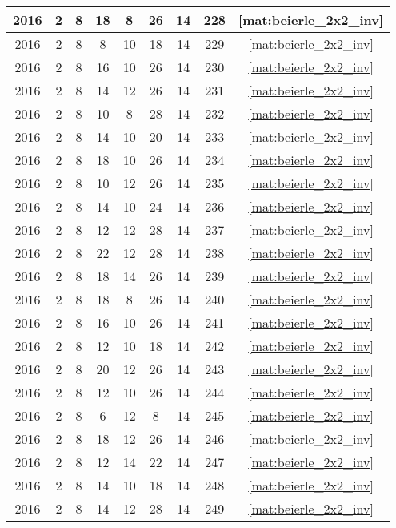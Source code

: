 \begin{longtable}{|c|c|c|c|c|c|c|c|c|}
2016 & 2 & 8 & 18 & 8 & 26 & 14 & 228 & \eqref{mat:beierle_2x2_inv} \\ \hline 
2016 & 2 & 8 & 8 & 10 & 18 & 14 & 229 & \eqref{mat:beierle_2x2_inv} \\ \hline 
2016 & 2 & 8 & 16 & 10 & 26 & 14 & 230 & \eqref{mat:beierle_2x2_inv} \\ \hline 
2016 & 2 & 8 & 14 & 12 & 26 & 14 & 231 & \eqref{mat:beierle_2x2_inv} \\ \hline 
2016 & 2 & 8 & 10 & 8 & 28 & 14 & 232 & \eqref{mat:beierle_2x2_inv} \\ \hline 
2016 & 2 & 8 & 14 & 10 & 20 & 14 & 233 & \eqref{mat:beierle_2x2_inv} \\ \hline 
2016 & 2 & 8 & 18 & 10 & 26 & 14 & 234 & \eqref{mat:beierle_2x2_inv} \\ \hline 
2016 & 2 & 8 & 10 & 12 & 26 & 14 & 235 & \eqref{mat:beierle_2x2_inv} \\ \hline 
2016 & 2 & 8 & 14 & 10 & 24 & 14 & 236 & \eqref{mat:beierle_2x2_inv} \\ \hline 
2016 & 2 & 8 & 12 & 12 & 28 & 14 & 237 & \eqref{mat:beierle_2x2_inv} \\ \hline 
2016 & 2 & 8 & 22 & 12 & 28 & 14 & 238 & \eqref{mat:beierle_2x2_inv} \\ \hline 
2016 & 2 & 8 & 18 & 14 & 26 & 14 & 239 & \eqref{mat:beierle_2x2_inv} \\ \hline 
2016 & 2 & 8 & 18 & 8 & 26 & 14 & 240 & \eqref{mat:beierle_2x2_inv} \\ \hline 
2016 & 2 & 8 & 16 & 10 & 26 & 14 & 241 & \eqref{mat:beierle_2x2_inv} \\ \hline 
2016 & 2 & 8 & 12 & 10 & 18 & 14 & 242 & \eqref{mat:beierle_2x2_inv} \\ \hline 
2016 & 2 & 8 & 20 & 12 & 26 & 14 & 243 & \eqref{mat:beierle_2x2_inv} \\ \hline 
2016 & 2 & 8 & 12 & 10 & 26 & 14 & 244 & \eqref{mat:beierle_2x2_inv} \\ \hline 
2016 & 2 & 8 & 6 & 12 & 8 & 14 & 245 & \eqref{mat:beierle_2x2_inv} \\ \hline 
2016 & 2 & 8 & 18 & 12 & 26 & 14 & 246 & \eqref{mat:beierle_2x2_inv} \\ \hline 
2016 & 2 & 8 & 12 & 14 & 22 & 14 & 247 & \eqref{mat:beierle_2x2_inv} \\ \hline 
2016 & 2 & 8 & 14 & 10 & 18 & 14 & 248 & \eqref{mat:beierle_2x2_inv} \\ \hline 
2016 & 2 & 8 & 14 & 12 & 28 & 14 & 249 & \eqref{mat:beierle_2x2_inv} \\ \hline 

\end{longtable}
